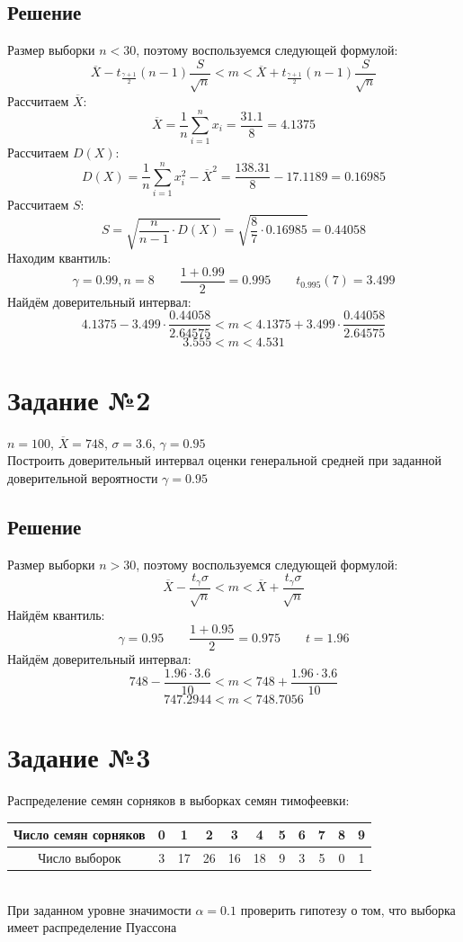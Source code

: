 \documentclass[12pt,a4paper]{report}
\begin{document}
\subsection*{Решение}
Размер выборки $n < 30$, поэтому воспользуемся следующей формулой:
$$\overline{X}-t_\frac{{\gamma + 1}}{2}(n-1)\frac{S}{\sqrt{n}}<m<\overline{X}+{t_\frac{\gamma + 1}{2}}(n-1)\frac{S}{\sqrt{n}}$$
Рассчитаем $\overline{X}$:
$$\overline{X}=\frac{1}{n}\sum_{i=1}^n x_i=\frac{31.1}{8}=4.1375$$
Рассчитаем $D(X)$:
$$D(X)=\frac{1}{n}\sum_{i=1}^n x_i^2-\overline{X}^2=\frac{138.31}{8}-17.1189=0.16985$$
Рассчитаем $S$:
$$S=\sqrt{\frac{n}{n-1}\cdot D(X)}=\sqrt{\frac{8}{7}\cdot 0.16985}=0.44058$$
Находим квантиль:
$$\gamma=0.99, n=8\qquad\frac{1 + 0.99}{2}=0.995\qquad t_{0.995}(7)=3.499$$
Найдём доверительный интервал:
$$4.1375-3.499\cdot\frac{0.44058}{2.64575} < m < 4.1375+3.499\cdot\frac{0.44058}{2.64575}$$
$$3.555 < m < 4.531$$
\section*{Задание №2}
$n=100$, $\overline{X}=748$, $\sigma=3.6$, $\gamma=0.95$\\
\hfill\break
Построить доверительный интервал оценки генеральной средней при заданной доверительной вероятности $\gamma = 0.95$
\subsection*{Решение}
Размер выборки $n > 30$, поэтому воспользуемся следующей формулой:
$$\overline{X}-\frac{t_\gamma\sigma}{\sqrt{n}} < m < \overline{X}+\frac{t_\gamma\sigma}{\sqrt{n}}$$
Найдём квантиль:
$$\gamma=0.95\qquad\frac{1+0.95}{2}=0.975\qquad t=1.96$$
Найдём доверительный интервал:
$$748-\frac{1.96\cdot 3.6}{10} < m < 748+\frac{1.96\cdot 3.6}{10}$$
$$747.2944 < m < 748.7056$$
\section*{Задание №3}
Распределение семян сорняков в выборках семян тимофеевки:\\
\hfill\break
\begin{tabular}{|c|c|c|c|c|c|c|c|c|c|c|}
    \hline
    Число семян сорняков & 0 & 1 & 2 & 3 & 4 & 5 & 6 & 7 & 8 & 9 \\
    \hline
    Число выборок & 3 & 17 & 26 & 16 & 18 & 9 & 3 & 5 & 0 & 1 \\
    \hline
\end{tabular}\\
\hfill\break
При заданном уровне значимости $\alpha=0.1$ проверить гипотезу о том, что выборка имеет распределение Пуассона
\end{document}
